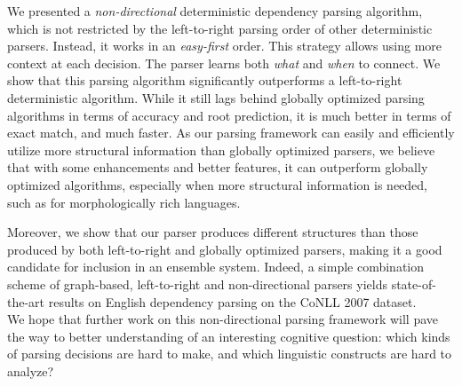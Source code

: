 \documentclass[11pt]{article}
\begin{document}
We presented a \textit{non-directional} deterministic dependency parsing algorithm, which is not restricted by the left-to-right parsing order of other deterministic parsers.  Instead, it works in an \textit{easy-first} order.  This strategy allows using more context at each decision.  The parser learns both \textit{what} and \textit{when} to connect.  We show that this parsing algorithm significantly outperforms a left-to-right deterministic algorithm.  While it still lags behind globally optimized parsing algorithms in terms of accuracy and root prediction, it is much better in terms of exact match, and much faster.  As our parsing framework can easily and efficiently utilize more structural information than globally optimized parsers, we believe that with some enhancements and better features, it can outperform globally optimized algorithms, especially when more structural information is needed, such as for morphologically rich languages.

Moreover, we show that our parser produces different structures than those produced by both left-to-right and globally optimized parsers, making it a good candidate for inclusion in an ensemble system.  Indeed, a simple combination scheme of graph-based, left-to-right and non-directional parsers yields state-of-the-art results on %
English dependency parsing on the CoNLL 2007 dataset.\\
We hope that further work on this non-directional parsing framework will pave the way to better understanding of an interesting cognitive question: which kinds of parsing decisions are hard to make, and which %
linguistic constructs are hard to analyze?



\end{document}
